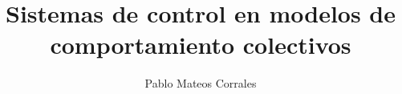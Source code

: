 
\title{Sistemas de control en modelos de comportamiento colectivos}
\author{Pablo Mateos Corrales}










\address{UCLM --- Escuela de Ingeniería Industrial y Aeroespacial\\
    Campus Universitario de la Real Fábrica de Armas}
